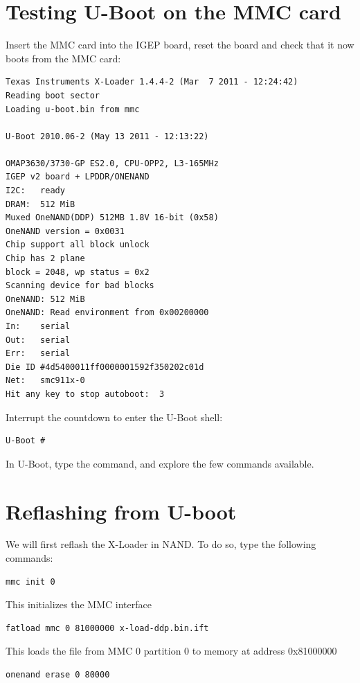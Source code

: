 \section{Testing U-Boot on the MMC card}

Insert the MMC card into the IGEP board, reset the board and check
that it now boots from the MMC card:

\begin{verbatim}
Texas Instruments X-Loader 1.4.4-2 (Mar  7 2011 - 12:24:42) 
Reading boot sector 
Loading u-boot.bin from mmc 

U-Boot 2010.06-2 (May 13 2011 - 12:13:22) 

OMAP3630/3730-GP ES2.0, CPU-OPP2, L3-165MHz 
IGEP v2 board + LPDDR/ONENAND 
I2C:   ready 
DRAM:  512 MiB 
Muxed OneNAND(DDP) 512MB 1.8V 16-bit (0x58) 
OneNAND version = 0x0031 
Chip support all block unlock 
Chip has 2 plane 
block = 2048, wp status = 0x2 
Scanning device for bad blocks 
OneNAND: 512 MiB 
OneNAND: Read environment from 0x00200000 
In:    serial 
Out:   serial 
Err:   serial 
Die ID #4d5400011ff0000001592f350202c01d 
Net:   smc911x-0 
Hit any key to stop autoboot:  3
\end{verbatim}

Interrupt the countdown to enter the U-Boot shell:
\begin{verbatim}
U-Boot # 
\end{verbatim}

In U-Boot, type the  command, and explore the few commands available.

\section{Reflashing from U-boot}

We will first reflash the X-Loader in NAND. To do so, type the following commands:

\begin{verbatim}
mmc init 0
\end{verbatim}

This initializes the MMC interface

\begin{verbatim}
fatload mmc 0 81000000 x-load-ddp.bin.ift
\end{verbatim}
This loads the file from MMC 0 partition 0 to memory at address 0x81000000

\begin{verbatim}
onenand erase 0 80000
\end{verbatim}

